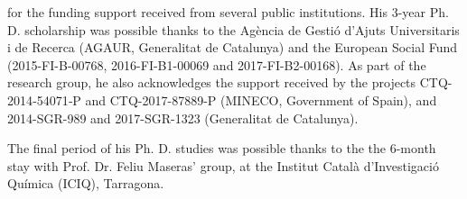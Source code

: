 
 for the funding support received from several public institutions. His 3-year Ph. D. scholarship was possible thanks to the Agència de Gestió d'Ajuts Universitaris i de Recerca (AGAUR, Generalitat de Catalunya) and the European Social Fund (2015-FI-B-00768, 2016-FI-B1-00069 and 2017-FI-B2-00168). As part of the research group, he also acknowledges the support received by the projects CTQ-2014‐54071‐P and CTQ-2017-87889-P (MINECO, Government of Spain), and 2014-SGR-989 and 2017-SGR-1323 (Generalitat de Catalunya).

The final period of his Ph. D. studies was possible thanks to the the 6-month stay with Prof. Dr. Feliu Maseras' group, at the Institut Català d'Investigació Química (ICIQ), Tarragona.
